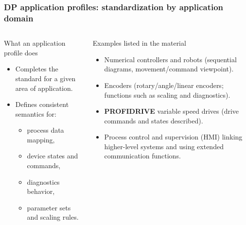 \begin{frame}
	\frametitle{DP application profiles: standardization by application domain}
	\justifying
	\begin{columns}[T]
			\begin{block}{What an application profile does}
				\begin{itemize}
					\item Completes the standard for a given area of application.
					\item Defines consistent semantics for:
					\begin{itemize}
						\item process data mapping,
						\item device states and commands,
						\item diagnostics behavior,
						\item parameter sets and scaling rules.
					\end{itemize}
				\end{itemize}
			\end{block}
			\begin{block}{Examples listed in the material}
				\begin{itemize}
					\item Numerical controllers and robots (sequential diagrams, movement/command viewpoint).
					\item Encoders (rotary/angle/linear encoders; functions such as scaling and diagnostics).
					\item \textbf{PROFIDRIVE} variable speed drives (drive commands and states described).
					\item Process control and supervision (HMI) linking higher-level systems and using extended communication functions.
				\end{itemize}
			\end{block}
	\end{columns}
\end{frame}

